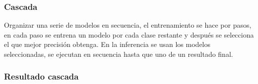 \documentclass{beamer}
\begin{document}
\begin{frame}
\frametitle{Cascada}

Organizar una serie de modelos en secuencia, el entrenamiento se hace por pasos, en cada paso se entrena un modelo por cada clase restante y después se selecciona el que mejor precisión obtenga. En la inferencia se usan los modelos seleccionadas, se ejecutan en secuencia hasta que uno de un resultado final.

\begin{figure}[H]
\centering
{}%
\qquad
{}%
\end{figure}

\end{frame}



\begin{frame}
\frametitle{Resultado cascada}

\begin{table}[H]
\centering
{}
\caption{Resultado cascada.}
\end{table}

\end{frame}
\end{document}
